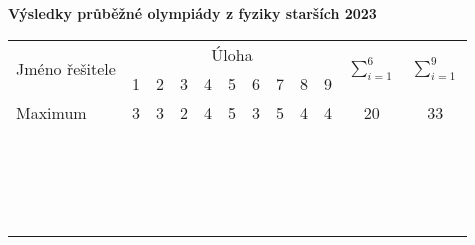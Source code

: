 \documentclass[12pt,a4paper,landscape]{article}
\begin{document}
\begin{center}
\textbf{\Large Výsledky průběžné olympiády z fyziky starších 2023}
\vspace{1em}

{\large
\noindent\begin{tabular}{|l||c|c|c|c|c|c||c|c|c||c|c|}
\hline
\multirow{2}{*}{Jméno řešitele} & \multicolumn{9}{|c||}{Úloha} & \multirow{2}{*}{$\sum_{i=1}^{6}$} & \multirow{2}{*}{$\sum_{i=1}^{9}$} \\
\cline{2-10}
 & 1 & 2 & 3 & 4 & 5 & 6 & 7 & 8 & 9 & & \\
\hline
Maximum & 3 & 3 & 2 & 4 & 5 & 3 & 5 & 4 & 4 & 20 & 33 \\
\hline\hline
\phantom{Opravdu megalne dlouhe jmeno} & \phantom{111} & \phantom{111} & \phantom{111} & \phantom{111} & \phantom{111} & \phantom{111} & \phantom{111} & \phantom{111} & \phantom{111} & \phantom{111} & \phantom{111} \\
\hline
 & & & & & & & & & & & \\
\hline
 & & & & & & & & & & & \\
\hline
 & & & & & & & & & & & \\
\hline
 & & & & & & & & & & & \\
\hline
 & & & & & & & & & & & \\
\hline
 & & & & & & & & & & & \\
\hline
 & & & & & & & & & & & \\
\hline
 & & & & & & & & & & & \\
\hline
 & & & & & & & & & & & \\
\hline
 & & & & & & & & & & & \\
\hline
 & & & & & & & & & & & \\
\hline
 & & & & & & & & & & & \\
\hline
 & & & & & & & & & & & \\
\hline
 & & & & & & & & & & & \\
\hline
 & & & & & & & & & & & \\
\hline
 & & & & & & & & & & & \\
\hline
 & & & & & & & & & & & \\
\hline

\end{tabular}
}
\end{center}
\end{document}
